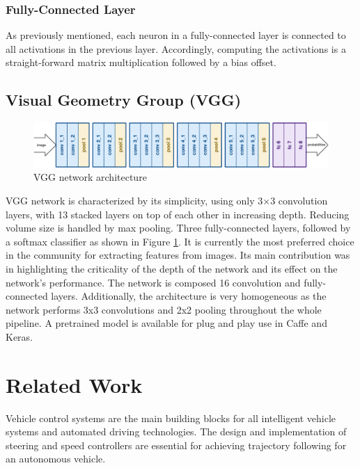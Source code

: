 \subsubsection{Fully-Connected Layer}
As previously mentioned, each neuron in a fully-connected layer is connected to all activations in the previous layer. Accordingly, computing the activations is a straight-forward matrix multiplication followed by a bias offset. 


\subsection{Visual Geometry Group (VGG)}
\begin{figure}[ht]
\includegraphics[trim={0cm 0cm 0cm 0cm},clip,width=\linewidth]{Figures/vgg.jpeg}
\centering
\caption{VGG network architecture}
\label{vgg}
\end{figure}
VGG network is characterized by its simplicity, using only 3×3 convolution layers, with 13 stacked layers on top of each other in increasing depth. Reducing volume size is handled by max pooling. Three fully-connected layers, followed by a softmax classifier as shown in Figure \ref{vgg}. It is currently the most preferred choice in the community for extracting features from images. Its main contribution was in highlighting the criticality of the depth of the network and its effect on the network's performance. The network is composed 16 convolution and fully-connected layers. Additionally, the architecture is very homogeneous as the network performs 3x3 convolutions and 2x2 pooling throughout the whole pipeline. A pretrained model is available for plug and play use in Caffe and Keras. \cite{vgg}





\section{Related Work}
Vehicle control systems are the main building blocks for all intelligent vehicle systems and automated driving technologies. The design and implementation of steering and speed controllers are essential for achieving trajectory following for an autonomous vehicle. 

